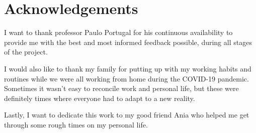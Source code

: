 \documentclass[a4paper]{IEEEtran}
\begin{document}
\section*{Acknowledgements}
I want to thank professor Paulo Portugal for his continuous availability  to provide me with the best and most informed feedback possible, during all stages of the project.

I would also like to thank my family for putting up with my working habits and routines while we were all working from home during the COVID-19 pandemic.
Sometimes it wasn't easy to reconcile work and personal life, but these were definitely times where everyone had to adapt to a new reality.

Lastly, I want to dedicate this work to my good friend Ania who helped me get through some rough times on my personal life.




\end{document}
